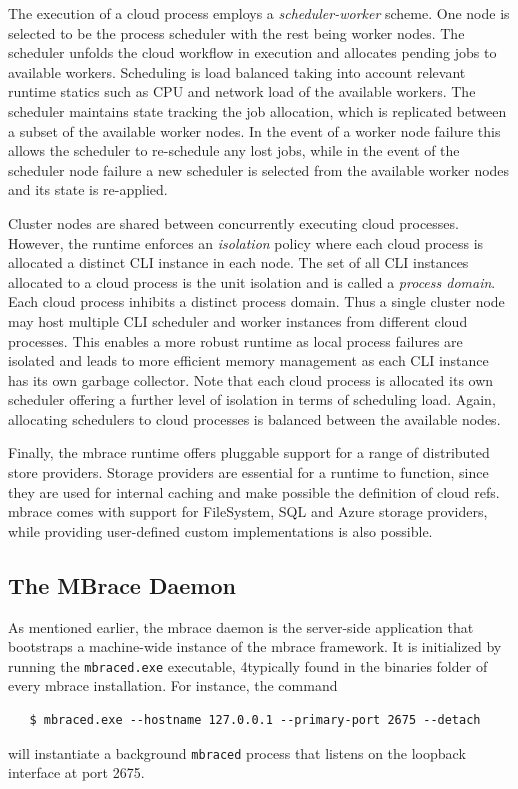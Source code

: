 \documentclass[9pt,a4paper]{article}
\newcommand{\mbrace}{mbrace}
\newcommand{\TitularMbrace}{MBrace}
\begin{document}
The execution of a cloud process employs a \emph{scheduler-worker} scheme. One
node is selected to be the process scheduler with the rest being worker
nodes. The scheduler unfolds the cloud workflow in execution and allocates
pending jobs to available workers. Scheduling is load balanced taking into
account relevant runtime statics such as CPU and network load of the available
workers. The scheduler maintains state tracking the job allocation, which is
replicated between a subset of the available worker nodes. In the event of a
worker node failure this allows the scheduler to re-schedule any lost jobs,
while in the event of the scheduler node failure a new scheduler is selected
from the available worker nodes and its state is re-applied.

Cluster nodes are shared between concurrently executing cloud
processes. However, the runtime enforces an \emph{isolation} policy where each
cloud process is allocated a distinct CLI instance in each node. The set of all
CLI instances allocated to a cloud process is the unit isolation and is called a
\emph{process domain}. Each cloud process inhibits a distinct process
domain. Thus a single cluster node may host multiple CLI scheduler and worker
instances from different cloud processes. This enables a more robust runtime as
local process failures are isolated and leads to more efficient memory
management as each CLI instance has its own garbage collector. Note that each
cloud process is allocated its own scheduler offering a further level of
isolation in terms of scheduling load. Again, allocating schedulers to cloud
processes is balanced between the available nodes.

Finally, the \mbrace{} runtime offers pluggable support for a range of
distributed store providers. Storage providers are essential for a runtime to
function, since they are used for internal caching and make possible the
definition of cloud refs. \mbrace{} comes with support for FileSystem, SQL and
Azure storage providers, while providing user-defined custom implementations is
also possible.

\subsection{The \TitularMbrace{} Daemon}

As mentioned earlier, the \mbrace{} daemon is the server-side application that
bootstraps a machine-wide instance of the \mbrace{} framework. It is initialized by
running the \texttt{mbraced.exe} executable, 4typically found in the binaries
folder of every \mbrace{} installation. For instance, the command
\begin{verbatim}
   $ mbraced.exe --hostname 127.0.0.1 --primary-port 2675 --detach
\end{verbatim}
will instantiate a background \texttt{mbraced} process that listens on
the loopback interface at port 2675.
\end{document}
